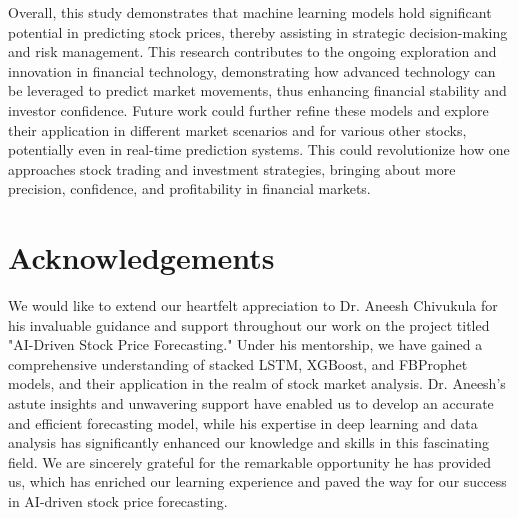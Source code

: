 \documentclass[12pt]{article}
\begin{document}
Overall, this study demonstrates that machine learning models hold significant potential in predicting stock prices, thereby assisting in strategic decision-making and risk management. This research contributes to the ongoing exploration and innovation in financial technology, demonstrating how advanced technology can be leveraged to predict market movements, thus enhancing financial stability and investor confidence. Future work could further refine these models and explore their application in different market scenarios and for various other stocks, potentially even in real-time prediction systems. This could revolutionize how one approaches stock trading and investment strategies, bringing about more precision, confidence, and profitability in financial markets.

\section{Acknowledgements}
We would like to extend our heartfelt appreciation to Dr. Aneesh Chivukula for his invaluable guidance and support throughout our work on the project titled "AI-Driven Stock Price Forecasting." Under his mentorship, we have gained a comprehensive understanding of stacked LSTM, XGBoost, and FBProphet models, and their application in the realm of stock market analysis. Dr. Aneesh's astute insights and unwavering support have enabled us to develop an accurate and efficient forecasting model, while his expertise in deep learning and data analysis has significantly enhanced our knowledge and skills in this fascinating field. We are sincerely grateful for the remarkable opportunity he has provided us, which has enriched our learning experience and paved the way for our success in AI-driven stock price forecasting.
\printbibliography
\end{document}
